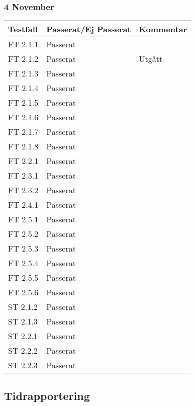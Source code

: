 \documentclass[a4paper]{article}
\begin{document}
\subsubsection{4 November}
\begin{tabular}{| l | l | p{9cm} |}
\hline
Testfall &  Passerat/Ej Passerat & Kommentar\\
\hline
FT 2.1.1 & Passerat & \\
\hline
FT 2.1.2 & Passerat & Utgått\\  
\hline
FT 2.1.3 & Passerat & \\
\hline
FT 2.1.4 & Passerat & \\
\hline
FT 2.1.5 & Passerat & \\
\hline
FT 2.1.6 & Passerat & \\
\hline
FT 2.1.7 & Passerat & \\
\hline
FT 2.1.8 & Passerat & \\
\hline
FT 2.2.1 & Passerat & \\
\hline
FT 2.3.1 & Passerat & \\
\hline
FT 2.3.2 & Passerat & \\
\hline
FT 2.4.1 & Passerat & \\
\hline
FT 2.5.1 & Passerat & \\
\hline
FT 2.5.2 & Passerat & \\
\hline
FT 2.5.3 & Passerat & \\
\hline
FT 2.5.4 & Passerat & \\
\hline
FT 2.5.5 & Passerat & \\
\hline
FT 2.5.6 & Passerat & \\
\hline
ST 2.1.2 & Passerat & \\
\hline
ST 2.1.3 & Passerat & \\
\hline
ST 2.2.1 & Passerat & \\
\hline
ST 2.2.2 & Passerat & \\
\hline
ST 2.2.3 & Passerat & \\
\hline
\end{tabular}








\subsection{Tidrapportering}
\end{document}
